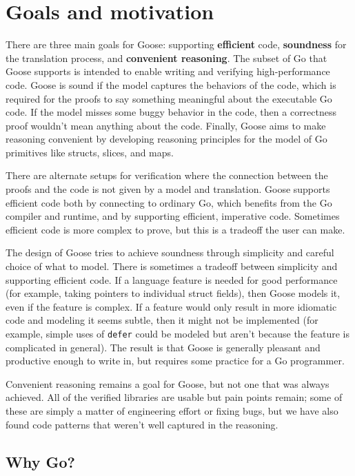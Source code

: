 \section{Goals and motivation}
\label{sec:goose:goals}

There are three main goals for Goose: supporting \textbf{efficient} code,
\textbf{soundness} for the translation process, and \textbf{convenient
reasoning}. The subset of Go that Goose supports is
intended to enable writing and verifying high-performance code. Goose
is sound if the model captures the behaviors of the code, which is required for
the proofs to say something meaningful about the executable Go code. If the model
misses some buggy behavior in the code, then a correctness proof wouldn't mean
anything about the code. Finally, Goose aims to make reasoning convenient by developing reasoning
principles for the model of Go primitives like structs, slices, and maps.

There are alternate setups for verification where the connection between the
proofs and the code is not given by a model and translation. Goose supports
efficient code both by connecting to ordinary Go, which benefits from the Go
compiler and runtime, and by supporting efficient, imperative code. Sometimes
efficient code is more complex to prove, but this is a tradeoff the user can
make.

The
design of Goose tries to achieve soundness through simplicity and careful choice
of what to model. There is sometimes a tradeoff between simplicity and
supporting efficient code. If a language feature is needed for good performance (for
example, taking pointers to individual struct fields), then Goose models it,
even if the feature is complex. If
a feature would only result in more idiomatic code and modeling it seems
subtle, then it might not be implemented (for example, simple uses of
\texttt{defer} could be modeled but aren't because the feature is complicated in
general). The result is that Goose is generally pleasant and productive enough
to write in, but requires some practice for a Go programmer.

Convenient reasoning remains a goal for Goose, but not one that was always
achieved. All of the verified libraries are usable but pain points remain; some
of these are simply a matter of engineering effort or fixing bugs, but we have
also found code patterns that weren't well captured in the reasoning.

\subsection{Why Go?}

